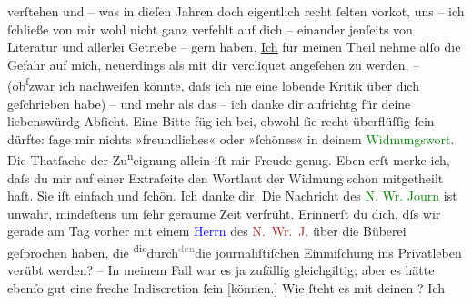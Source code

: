                verſtehen und – was in dieſen Jahren {\pb}doch eigentlich recht
               ſelten vorko{\geminationm}t, uns – ich ſchließe von mir wohl nicht
               ganz verfehlt auf dich – einander jenſeits von Literatur und allerlei Getriebe – gern
               haben. \uline{Ich} für meinen Theil nehme alſo die Gefahr auf
               mich, neuerdings als mit dir vercliquet angeſehen zu werden, \introOben{}–\introOben{} (ob\substVorne{}\textsuperscript{ſ}\substDazwischen{}z\substHinten{}war ich nachweiſen könnte, daſs ich nie eine lobende Kritik über dich
               geſchrieben habe) – und {\pb}mehr als das – ich danke dir aufrichtg für deine liebenswürdg Abſicht. Eine Bitte
               füg ich bei, obwohl ſie recht überflüſſig ſein dürfte: ſage mir nichts »freundliches«
               oder »ſchönes« in deinem \textcolor{green}{Widmungswort}{}. Die Thatſache der Zu\substVorne{}\textsuperscript{n}\substDazwischen{}ei\substHinten{}gnung allein iſt mir Freude genug.\pend
           \pstart
           Eben erſt merke ich, daſs du mir auf einer Extraſeite den Wortlaut der Widmung schon
               mitgetheilt haſt. Sie iſt einfach und ſchön. Ich danke dir.\pend
           \pstart
           {\pb}Die Nachricht des \textcolor{green}{N. Wr. Journ}{}\ledrightnote{\textcolor{green}{Neues Wiener Journal}} ist unwahr, mindeſtens um ſehr geraume
               Zeit verfrüht. Erinnerſt du dich, dſs wir gerade am Tag vorher mit einem \textcolor{blue}{Herrn}{} des \textcolor{brown}{N. Wr. J.}{}\ledrightnote{\textcolor{brown}{Neues Wiener Journal}} über die Büberei geſprochen haben, die \substVorne{}\textsuperscript{die}\substDazwischen{}durch\substHinten{}{ }\substVorne{}\textsuperscript{\textcolor{gray}{den}}\substDazwischen{}die\substHinten{} journaliſtiſchen Einmiſchung ins Privatleben verübt werden? – In meinem Fall
               war es ja zufällig gleichgiltig; aber es hätte ebenſo gut eine freche Indiscretion
               ſein {[}können.{]}\pend
           \pstart
            Wie ſteht es mit deinen \label{K_L01287_1v}\label{K_L01287_1h}? Ich
